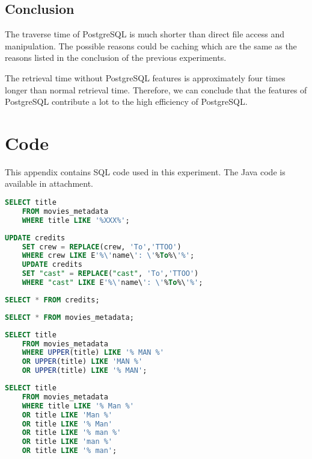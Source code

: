 \documentclass[a4paper,12pt]{article}
\begin{document}
\subsection{Conclusion}
The traverse time of PostgreSQL is much shorter than direct file access and manipulation.
The possible reasons could be caching which are the same as the reasons listed in the conclusion of the previous experiments.

The retrieval time without PostgreSQL features is approximately four times longer than normal retrieval time.
Therefore, we can conclude that the features of PostgreSQL contribute a lot to the high efficiency of PostgreSQL.
\newpage
\appendix
\section{Code}
This appendix contains SQL code used in this experiment.
The Java code is available in attachment.
\begin{lstlisting}[language=SQL, caption=SQL for Retrieval Test]
    SELECT title 
    FROM movies_metadata 
    WHERE title LIKE '%XXX%';
\end{lstlisting}

\begin{lstlisting}[language=SQL, caption=SQL for Update Test]
    UPDATE credits
    SET crew = REPLACE(crew, 'To','TTOO')
    WHERE crew LIKE E'%\'name\': \'%To%\'%';
    UPDATE credits
    SET "cast" = REPLACE("cast", 'To','TTOO')
    WHERE "cast" LIKE E'%\'name\': \'%To%\'%';
\end{lstlisting}

\begin{lstlisting}[language=SQL, caption=SQL for Traverse Test(1)]
    SELECT * FROM credits;
\end{lstlisting}

\begin{lstlisting}[language=SQL, caption=SQL for Traverse Test(2)]
    SELECT * FROM movies_metadata;
\end{lstlisting}

\begin{lstlisting}[language=SQL, caption=SQL for Retrieval Test without PostgreSQL Features(1)]
    SELECT title
    FROM movies_metadata
    WHERE UPPER(title) LIKE '% MAN %'
    OR UPPER(title) LIKE 'MAN %'
    OR UPPER(title) LIKE '% MAN';
\end{lstlisting}

\begin{lstlisting}[language=SQL, caption=SQL for Retrieval Test without PostgreSQL Features(2)]
    SELECT title
    FROM movies_metadata
    WHERE title LIKE '% Man %'
    OR title LIKE 'Man %'
    OR title LIKE '% Man'
    OR title LIKE '% man %'
    OR title LIKE 'man %'
    OR title LIKE '% man';
\end{lstlisting}
\end{document}
